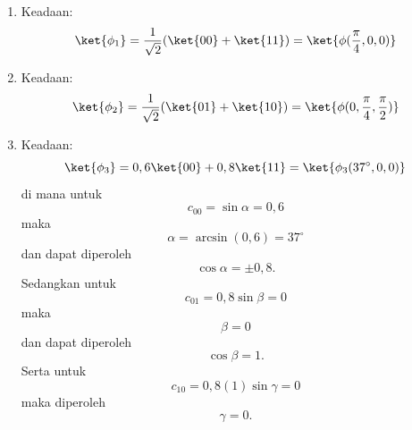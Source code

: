 \begin{enumerate}
	\item Keadaan:
	\begin{equation}
		\ket{\phi_1}=\frac{1}{\sqrt{2}}(\ket{00}+\ket{11})=\ket{\phi(\frac{\pi}{4},0,0)} \label{keadaan1,2qubit}
	\end{equation}
	
	\item Keadaan:
	\begin{equation}
		\ket{\phi_2}=\frac{1}{\sqrt{2}}(\ket{01}+\ket{10})=\ket{\phi(0,\frac{\pi}{4},\frac{\pi}{2})} \label{keadaan2,2qubit}
	\end{equation}
	
	\item Keadaan:
	\begin{equation}
		\ket{\phi_3}=0,6\ket{00}+0,8\ket{11}=\ket{\phi_3(37^{\circ},0,0)} \label{keadaan3,2qubit}
	\end{equation}
	di mana untuk
	\begin{equation*}
		c_{00}=\sin\alpha=0,6
	\end{equation*}
	maka
	\begin{equation*}
		\alpha=\arcsin(0,6)=37^{\circ}
	\end{equation*}
	dan dapat diperoleh
	\begin{equation*}
		\cos\alpha=\pm 0,8.
	\end{equation*}
	Sedangkan untuk
	\begin{equation*}
		c_{01}=0,8\sin\beta=0
	\end{equation*}
	maka
	\begin{equation*}
		\beta=0
	\end{equation*}
	dan dapat diperoleh
	\begin{equation*}
		\cos\beta=1.
	\end{equation*}
	Serta untuk
	\begin{equation*}
		c_{10}=0,8(1)\sin\gamma=0
	\end{equation*}
	maka diperoleh
	\begin{equation*}
		\gamma=0.
	\end{equation*}
	

\end{enumerate}

